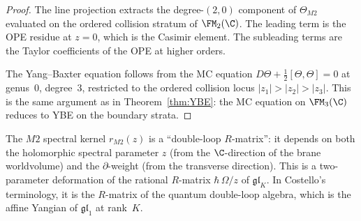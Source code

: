 \begin{proof}
The line projection extracts the degree-$(2,0)$ component of
$\Theta_{M2}$ evaluated on the ordered collision stratum
of $\FM_2(\C)$. The leading term is the OPE residue at
$z=0$, which is the Casimir element. The subleading terms
are the Taylor coefficients of the OPE at higher orders.

The Yang--Baxter equation follows from the MC equation
$D\Theta+\tfrac{1}{2}[\Theta,\Theta]=0$ at genus~$0$,
degree~$3$, restricted to the ordered collision locus
$|z_1|>|z_2|>|z_3|$. This is the same argument as in
Theorem~\ref{thm:YBE}: the MC equation on $\FM_3(\C)$
reduces to YBE on the boundary strata.
\end{proof}

\begin{remark}
The $M2$ spectral kernel $r_{M2}(z)$ is a ``double-loop
$R$-matrix'': it depends on both the holomorphic spectral
parameter $z$ (from the $\C$-direction of the brane worldvolume)
and the $\partial$-weight (from the transverse direction). This
is a two-parameter deformation of the rational $R$-matrix
$\hbar\,\Omega/z$ of $\mathfrak{gl}_K$. In Costello's terminology, it
is the $R$-matrix of the quantum double-loop algebra, which is
the affine Yangian of $\mathfrak{gl}_1$ at rank~$K$.
\end{remark}


